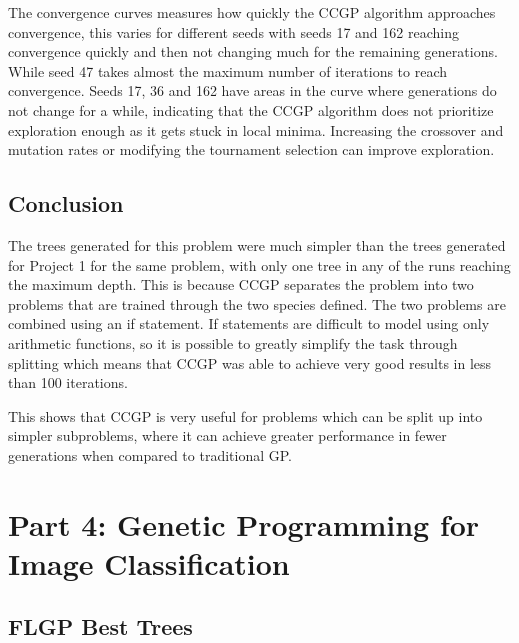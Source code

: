 \documentclass{article}
\begin{document}
\noindent The convergence curves measures how quickly the CCGP algorithm approaches convergence, this varies for different seeds with seeds 17 and 162 reaching convergence quickly and then not changing much for the remaining generations. While seed 47 takes almost the maximum number of iterations to reach convergence. Seeds 17, 36 and 162 have areas in the curve where generations do not change for a while, indicating that the CCGP algorithm does not prioritize exploration enough as it gets stuck in local minima. Increasing the crossover and mutation rates or modifying the tournament selection can improve exploration. \par
	
\subsection*{Conclusion}
The trees generated for this problem were much simpler than the trees generated for Project 1 for the same problem, with only one tree in any of the runs reaching the maximum depth. This is because CCGP separates the problem into two problems that are trained through the two species defined. The two problems are combined using an if statement. If statements are difficult to model using only arithmetic functions, so it is possible to greatly simplify the task through splitting which means that CCGP was able to achieve very good results in less than 100 iterations.  \par
\noindent  This shows that CCGP is very useful for problems which can be split up into simpler subproblems, where it can achieve greater performance in fewer generations when compared to traditional GP. \par

\section*{Part 4: Genetic Programming for Image Classification}
\subsection*{FLGP Best Trees}
\end{document}
